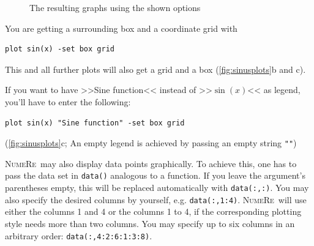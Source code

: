 \documentclass[DIV=14,headsepline,footsepline]{scrbook}
\newcommand{\NR}{\textsc{Nu\-me\-Re}}
\begin{document}
\begin{figure}[p]
					\caption{The resulting graphs using the shown options}
					\label{fig:sinusplots}
				\end{figure}
				
				You are getting a surrounding box and a coordinate grid with 
				\begin{lstlisting}
plot sin(x) -set box grid
				\end{lstlisting}
				This and all further plots will also get a grid and a box (\autoref{fig:sinusplots}b and c).
				
				If you want to have >>Sine function<< instead of >>$\sin(x)$<< as legend, you'll have to enter the following:
				\begin{lstlisting}
plot sin(x) "Sine function" -set box grid
				\end{lstlisting}
				(\autoref{fig:sinusplots}c; An empty legend is achieved by passing an empty string \verb+""+)
				
				\NR\ may also display data points graphically. To achieve this, one has to pass the data set in \verb+data()+ analogous to a function. If you leave the argument's parentheses empty, this will be replaced automatically with \verb+data(:,:)+. You may also specify the desired columns by yourself, e.g. \verb+data(:,1:4)+. \NR\ will use either the columns 1 and 4 or the columns 1 to 4, if the corresponding plotting style needs more than two columns. You may specify up to six columns in an arbitrary order: \verb+data(:,4:2:6:1:3:8)+.
				
\end{document}
